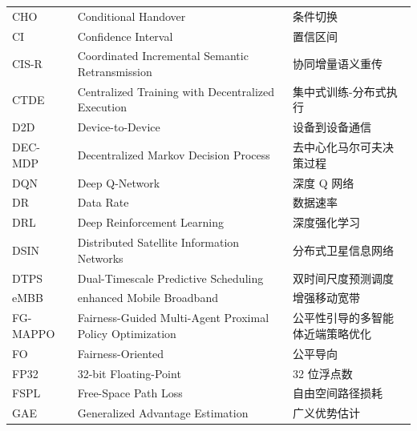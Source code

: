 \begin{abbreviation}
\begin{longtable}{@{} p{} p{} p{} @{}}
  CHO       & Conditional Handover                                            & 条件切换                      \\
  CI        & Confidence Interval                                             & 置信区间                      \\
  CIS-R     & Coordinated Incremental Semantic Retransmission                  & 协同增量语义重传              \\
  CTDE      & Centralized Training with Decentralized Execution               & 集中式训练-分布式执行         \\
  D2D       & Device-to-Device                                                & 设备到设备通信                \\
  DEC-MDP   & Decentralized Markov Decision Process                           & 去中心化马尔可夫决策过程      \\
  DQN       & Deep Q-Network                                                  & 深度 Q 网络                   \\
  DR        & Data Rate                                                       & 数据速率                      \\
  DRL       & Deep Reinforcement Learning                                     & 深度强化学习                  \\
  DSIN      & Distributed Satellite Information Networks                      & 分布式卫星信息网络            \\
  DTPS      & Dual-Timescale Predictive Scheduling                            & 双时间尺度预测调度            \\
  eMBB      & enhanced Mobile Broadband                                       & 增强移动宽带                  \\
  FG-MAPPO  & Fairness-Guided Multi-Agent Proximal Policy Optimization        & 公平性引导的多智能体近端策略优化 \\
  FO        & Fairness-Oriented                                               & 公平导向                      \\
  FP32      & 32-bit Floating-Point                                           & 32 位浮点数                   \\
  FSPL      & Free-Space Path Loss                                            & 自由空间路径损耗              \\
  GAE       & Generalized Advantage Estimation                                & 广义优势估计                  \\

\end{longtable}
\end{abbreviation}
